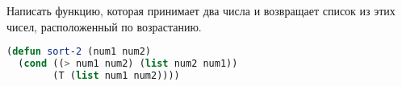 Написать функцию, которая принимает два числа и возвращает список из этих
чисел, расположенный по возрастанию.

\begin{lstlisting}[language=Lisp]
(defun sort-2 (num1 num2)
  (cond ((> num1 num2) (list num2 num1))
        (T (list num1 num2))))
\end{lstlisting}

